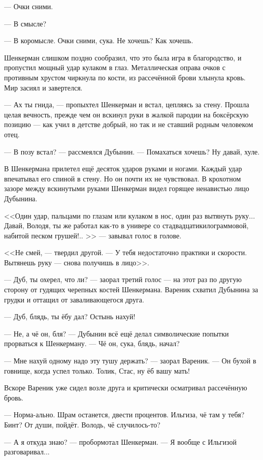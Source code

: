 \documentclass[a4paper,10pt,fleqn]{book}\usepackage{polyglossia}\setdefaultlanguage{english}\setotherlanguage{russian}\defaultfontfeatures{Ligatures=TeX,Mapping=tex-text} \usepackage{xcolor}\definecolor{lightgray}{HTML}{bbbbbb}\color{lightgray}\newcommand{\ml}[3]{\textcolor{black}{#3}}
\begin{document}
--- Очки сними.

--- В смысле?

--- В коромысле.
Очки сними, сука.
Не хочешь?
Как хочешь.

Шенкерман слишком поздно сообразил, что это была игра в благородство, и пропустил мощный удар кулаком в глаз.
Металлическая оправа очков с противным хрустом чиркнула по кости, из рассечённой брови хлынула кровь.
Мир засиял и завертелся.

--- Ах ты гнида, --- пропыхтел Шенкерман и встал, цепляясь за стену.
Прошла целая вечность, прежде чем он вскинул руки в жалкой пародии на боксёрскую позицию --- как учил в детстве добрый, но так и не ставший родным человеком отец.

--- В позу встал? --- рассмеялся Дубынин.
--- Помахаться хочешь?
Ну давай, хуле.

В Шенкермана прилетел ещё десяток ударов руками и ногами.
Каждый удар впечатывал его спиной в стену.
Но он почти их не чувствовал.
В крохотном зазоре между вскинутыми руками Шенкерман видел горящее ненавистью лицо Дубынина.

<<Один удар, пальцами по глазам или кулаком в нос, один раз вытянуть руку...
Давай, Володя, ты же работал как-то в универе со стадвадцатикилограммовой, набитой песком грушей!.. >> --- завывал голос в голове.

<<Не смей, --- твердил другой.
--- У тебя недостаточно практики и скорости.
Вытянешь руку --- снова получишь в лицо>>.

--- Дуб, ты охерел, что ли? --- заорал третий голос --- на этот раз по другую сторону от гудящих черепных костей Шенкермана.
Вареник схватил Дубынина за грудки и оттащил от заваливающегося друга.

--- Дуб, блядь, ты ёбу дал?
Остынь нахуй!

--- Не, а чё он, бля? --- Дубынин всё ещё делал символические попытки прорваться к Шенкерману.
--- Чё он, сука, блядь, начал?

--- Мне нахуй одному надо эту тушу держать? --- заорал Вареник.
--- Он бухой в говнище, когда успел только.
Толик, Стас, ну ёб вашу мать!

Вскоре Вареник уже сидел возле друга и критически осматривал рассечённую бровь.

--- Норма-ально.
Шрам останется, двести процентов.
Ильгиза, чё там у тебя?
Бинт?
От души, пойдёт.
Володь, чё случилось-то?

--- А я откуда знаю? --- пробормотал Шенкерман.
--- Я вообще с Ильгизой разговаривал...
\end{document}
